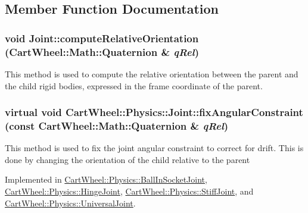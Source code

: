 \subsection{Member Function Documentation}
\hypertarget{classCartWheel_1_1Physics_1_1Joint_a345db35db31fb2bbd73e5608792390ad}{
\subsubsection[{computeRelativeOrientation}]{\setlength{\rightskip}{0pt plus 5cm}void Joint::computeRelativeOrientation ({\bf CartWheel::Math::Quaternion} \& {\em qRel})}}
\label{classCartWheel_1_1Physics_1_1Joint_a345db35db31fb2bbd73e5608792390ad}
This method is used to compute the relative orientation between the parent and the child rigid bodies, expressed in the frame coordinate of the parent. \hypertarget{classCartWheel_1_1Physics_1_1Joint_ab14f1e87562d9f5993504621d2cf3569}{
\subsubsection[{fixAngularConstraint}]{\setlength{\rightskip}{0pt plus 5cm}virtual void CartWheel::Physics::Joint::fixAngularConstraint (const {\bf CartWheel::Math::Quaternion} \& {\em qRel})}}
\label{classCartWheel_1_1Physics_1_1Joint_ab14f1e87562d9f5993504621d2cf3569}
This method is used to fix the joint angular constraint to correct for drift. This is done by changing the orientation of the child relative to the parent 

Implemented in \hyperlink{classCartWheel_1_1Physics_1_1BallInSocketJoint_a4d40c7d01cbb85ff85f5177cbb19a9ff}{CartWheel::Physics::BallInSocketJoint}, \hyperlink{classCartWheel_1_1Physics_1_1HingeJoint_a0245e9da2588e69062102bb6750906d0}{CartWheel::Physics::HingeJoint}, \hyperlink{classCartWheel_1_1Physics_1_1StiffJoint_a85fb008cc0917d1f2fd7c6d6fbda4331}{CartWheel::Physics::StiffJoint}, and \hyperlink{classCartWheel_1_1Physics_1_1UniversalJoint_aa412e188e11d12d1a45dc28fcc317b3e}{CartWheel::Physics::UniversalJoint}.

